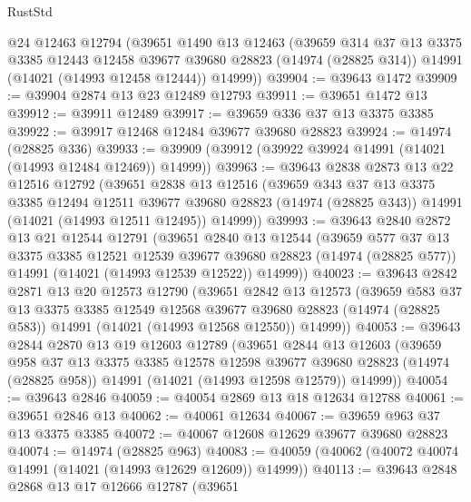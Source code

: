 \begin{lexlean}{RustStd}
\begin{coremodule}
    @24
    @12463
    @12794
    (@39651
      @1490
      @13
      @12463
      (@39659
        @314
        @37
        @13
        @3375
        @3385
        @12443
        @12458
        @39677
        @39680
        @28823
        (@14974 (@28825 @314))
        @14991
        (@14021 (@14993 @12458 @12444))
        @14999))
@39904 := @39643 @1472
@39909 := @39904 @2874 @13 @23 @12489 @12793
@39911 := @39651 @1472 @13
@39912 := @39911 @12489
@39917 := @39659 @336 @37 @13 @3375 @3385
@39922 := @39917 @12468 @12484 @39677 @39680 @28823
@39924 := @14974 (@28825 @336)
@39933 := @39909 (@39912 (@39922 @39924 @14991 (@14021 (@14993 @12484 @12469)) @14999))
@39963 := @39643
    @2838
    @2873
    @13
    @22
    @12516
    @12792
    (@39651
      @2838
      @13
      @12516
      (@39659
        @343
        @37
        @13
        @3375
        @3385
        @12494
        @12511
        @39677
        @39680
        @28823
        (@14974 (@28825 @343))
        @14991
        (@14021 (@14993 @12511 @12495))
        @14999))
@39993 := @39643
    @2840
    @2872
    @13
    @21
    @12544
    @12791
    (@39651
      @2840
      @13
      @12544
      (@39659
        @577
        @37
        @13
        @3375
        @3385
        @12521
        @12539
        @39677
        @39680
        @28823
        (@14974 (@28825 @577))
        @14991
        (@14021 (@14993 @12539 @12522))
        @14999))
@40023 := @39643
    @2842
    @2871
    @13
    @20
    @12573
    @12790
    (@39651
      @2842
      @13
      @12573
      (@39659
        @583
        @37
        @13
        @3375
        @3385
        @12549
        @12568
        @39677
        @39680
        @28823
        (@14974 (@28825 @583))
        @14991
        (@14021 (@14993 @12568 @12550))
        @14999))
@40053 := @39643
    @2844
    @2870
    @13
    @19
    @12603
    @12789
    (@39651
      @2844
      @13
      @12603
      (@39659
        @958
        @37
        @13
        @3375
        @3385
        @12578
        @12598
        @39677
        @39680
        @28823
        (@14974 (@28825 @958))
        @14991
        (@14021 (@14993 @12598 @12579))
        @14999))
@40054 := @39643 @2846
@40059 := @40054 @2869 @13 @18 @12634 @12788
@40061 := @39651 @2846 @13
@40062 := @40061 @12634
@40067 := @39659 @963 @37 @13 @3375 @3385
@40072 := @40067 @12608 @12629 @39677 @39680 @28823
@40074 := @14974 (@28825 @963)
@40083 := @40059 (@40062 (@40072 @40074 @14991 (@14021 (@14993 @12629 @12609)) @14999))
@40113 := @39643
    @2848
    @2868
    @13
    @17
    @12666
    @12787
    (@39651

\end{coremodule}
\end{lexlean}
